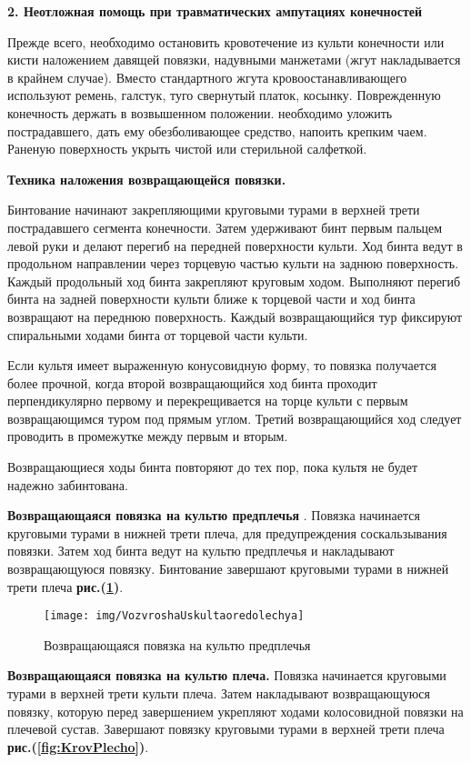 \documentclass[12pt,a4paper]{report}
\begin{document}
\textbf{2. Неотложная помощь при травматических ампутациях конечностей}

Прежде всего, необходимо остановить кровотечение из культи конечности или кисти наложением давящей повязки, надувными манжетами (жгут накладывается в крайнем случае). Вместо стандартного жгута кровоостанавливающего используют ремень, галстук, туго свернутый платок, косынку. Поврежденную конечность держать в возвышенном положении. необходимо уложить пострадавшего, дать ему обезболивающее средство, напоить крепким чаем. Раненую поверхность укрыть чистой или стерильной салфеткой.

\textbf{Техника наложения возвращающейся повязки.}

Бинтование начинают закрепляющими круговыми турами в верхней трети пострадавшего сегмента конечности. Затем удерживают бинт первым пальцем левой руки и делают перегиб на передней поверхности культи. Ход бинта ведут в продольном направлении через торцевую частью культи на заднюю поверхность. Каждый продольный ход бинта закрепляют круговым ходом. Выполняют перегиб бинта на задней поверхности культи ближе к торцевой части и ход бинта возвращают на переднюю поверхность. Каждый возвращающийся тур фиксируют спиральными ходами бинта от торцевой части культи.


Если культя имеет выраженную конусовидную форму, то повязка получается более прочной, когда второй возвращающийся ход бинта проходит перпендикулярно первому и перекрещивается на торце культи с первым возвращающимся туром под прямым углом. Третий возвращающийся ход следует проводить в промежутке между первым и вторым.

Возвращающиеся ходы бинта повторяют до тех пор, пока культя не будет надежно забинтована.

\textbf{Возвращающаяся повязка на культю предплечья }. Повязка начинается круговыми турами в нижней трети плеча, для предупреждения соскальзывания повязки. Затем ход бинта ведут на культю предплечья и накладывают возвращающуюся повязку. Бинтование завершают круговыми турами в нижней трети плеча \textbf{рис.(\ref{fig:VozvroshaUskultaoredolechya})}.

\begin{figure}[h]
\centering
\texttt{[image: img/VozvroshaUskultaoredolechya]}
\caption[]{Возвращающаяся повязка на культю предплечья}
\label{fig:VozvroshaUskultaoredolechya}
\end{figure}


\textbf{Возвращающаяся повязка на культю плеча.} Повязка начинается круговыми турами в верхней трети культи плеча. Затем накладывают возвращающуюся повязку, которую перед завершением укрепляют ходами колосовидной повязки на плечевой сустав. Завершают повязку круговыми турами в верхней трети плеча \textbf{ рис.(\ref{fig:KrovPlecho})}.
\end{document}
